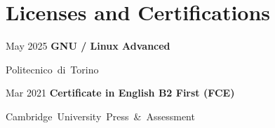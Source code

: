 \section{Licenses and Certifications}

\begin{samepage}
    \begin{twocolentry}{
        May 2025 %
    }
        \textbf{GNU / Linux Advanced}

        \vspace{0.10 cm}

        \mbox{Politecnico di Torino}
        \vspace{0.10 cm}

    \end{twocolentry}
\end{samepage}

\vspace{0.2 cm} %

\begin{samepage}
    \begin{twocolentry}{
        Mar 2021 %
    }
        \textbf{Certificate in English B2 First (FCE)}

        \vspace{0.10 cm}

        \mbox{Cambridge University Press \& Assessment}
        \vspace{0.10 cm}

    \end{twocolentry}
\end{samepage}
